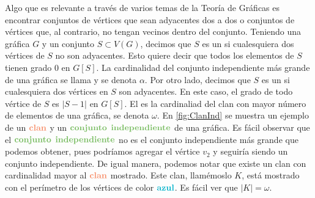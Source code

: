     Algo que es relevante a trav\'es de varios temas de la Teor\'ia de
     Gr\'aficas es encontrar conjuntos de v\'ertices que sean adyacentes dos a
     dos o conjuntos de v\'ertices que, al contrario, no tengan vecinos dentro
     del conjunto. Teniendo una gr\'afica $G$ y un conjunto $S \subset V(G)$,
     decimos que $S$ es un  si cualesquiera dos
     v\'ertices de $S$ no son adyacentes. Esto quiere decir que todos los
     elementos de $S$ tienen grado $0$ en $G[S]$. La cardinalidad del conjunto
     independiente m\'as grande de una gr\'afica se llama  y se denota $\alpha$. Por otro lado, decimos que $S$ es un
      si cualesquiera dos v\'ertices en $S$ son adyacentes. En este
     caso, el grado de todo v\'ertice de $S$ es $|S-1|$ en $G[S]$. El
      es la cardinaliad del clan con mayor n\'umero de
     elementos de una gr\'afica, se denota $\omega$. En \cref{fig:ClanInd} se
     muestra un ejemplo de un ${\color{coral}\bf clan}$ y un ${\color{verde}\bf
     conjunto}$ ${\color{verde}\bf independiente}$ de una gr\'afica. Es f\'acil
     observar que el ${\color{verde}\bf conjunto}$ ${\color{verde}\bf
     independiente}$ no es el conjunto independiente m\'as grande que podemos
     obtener, pues podr\'iamos agregar el v\'ertice $v_2$ y seguir\'ia siendo un
     conjunto independiente. De igual manera, podemos notar que existe un clan
     con cardinalidad mayor al ${\color{coral}\bf clan}$ mostrado. Este clan,
     llam\'emoslo $K$, est\'a mostrado con el per\'imetro de los v\'ertices de
     color ${\color{azulCielo}\bf azul}$. Es f\'acil ver que $|K| = \omega$.



